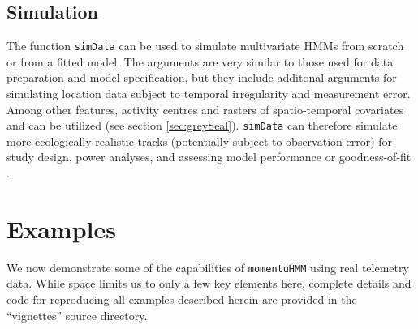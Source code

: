 \documentclass[12pt]{article}\usepackage[]{graphicx}\usepackage[]{color}
\begin{document}
\subsection{Simulation}
The function \verb|simData| can be used to simulate multivariate HMMs from scratch or from a fitted model. The arguments are very similar to those used for data preparation and model specification, but they include additonal arguments for simulating location data subject to temporal irregularity and measurement error. Among other features, activity centres and rasters of spatio-temporal covariates and can be utilized (see section \ref{sec:greySeal}). \verb|simData| can therefore simulate more ecologically-realistic tracks (potentially subject to observation error) 
for study design, power analyses, and assessing model performance or goodness-of-fit \citep{MoralesEtAl2004}. %
  
\section{Examples}
\label{sec:example}
We now demonstrate some of the capabilities of \verb|momentuHMM| using real telemetry data. %
While space limits us to only a few key elements here, complete details and code for reproducing all examples described herein are provided in the ``vignettes'' source directory.
\end{document}
